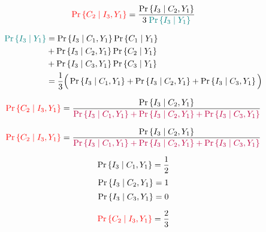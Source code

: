 \begin{frame}{}
  \begin{align*}
    \textcolor{red}{\Pr\left\{C_2 \mid I_3, Y_1\right\}} = \frac{\Pr{\left\{I_3 \mid C_2, Y_1\right\}}}{3\; \textcolor{teal}{\Pr\left\{I_3 \mid Y_1\right\}}}
  \end{align*}

  \begin{align*}
    \textcolor{teal}{\Pr{\left\{I_3 \mid Y_1\right\}}} &= \Pr\left\{I_3 \mid C_1, Y_1\right\} \Pr\left\{C_1 \mid Y_1\right\} \\
      &+ \Pr\left\{I_3 \mid C_2, Y_1\right\} \Pr\left\{C_2 \mid Y_1\right\} \\
      &+ \Pr\left\{I_3 \mid C_3, Y_1\right\} \Pr\left\{C_3 \mid Y_1\right\} \\
      &= \frac{1}{3}\Big(\Pr\left\{I_3 \mid C_1, Y_1\right\} + \Pr\left\{I_3 \mid C_2, Y_1\right\} + \Pr\left\{I_3 \mid C_3, Y_1\right\}\Big)
  \end{align*}

  \begin{align*}
    \textcolor{red}{\Pr\left\{C_2 \mid I_3, Y_1\right\}} = \frac{\Pr{\left\{I_3 \mid C_2, Y_1\right\}}}
      {\textcolor{purple}{\Pr\left\{I_3 \mid C_1, Y_1\right\} + \Pr\left\{I_3 \mid C_2, Y_1\right\} + \Pr\left\{I_3 \mid C_3, Y_1\right\}}}
  \end{align*}
\end{frame}

\begin{frame}{}
  \begin{align*}
    \textcolor{red}{\Pr\left\{C_2 \mid I_3, Y_1\right\}} = \frac{\Pr{\left\{I_3 \mid C_2, Y_1\right\}}}
      {\textcolor{purple}{\Pr\left\{I_3 \mid C_1, Y_1\right\} + \Pr\left\{I_3 \mid C_2, Y_1\right\} + \Pr\left\{I_3 \mid C_3, Y_1\right\}}}
  \end{align*}

  \pause
  \vspace{0.30cm}
  \centerline{}

  \pause
  \vspace{0.30cm}
  \[
    \Pr\left\{I_3 \mid C_1, Y_1\right\} = \frac{1}{2}
  \]
  \[
    \Pr\left\{I_3 \mid C_2, Y_1\right\} = 1
  \]
  \[
    \Pr\left\{I_3 \mid C_3, Y_1\right\} = 0
  \]

  \pause
  \[
    \textcolor{red}{\Pr\left\{C_2 \mid I_3, Y_1\right\}} = \frac{2}{3}
  \]
\end{frame}

